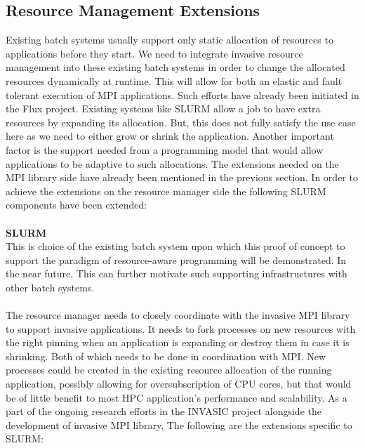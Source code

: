 \subsection{Resource Management Extensions}
Existing batch systems usually support only static allocation of resources to applications before they start. We need to integrate invasive resource management into these existing batch systems in order to change the allocated resources dynamically at runtime. This will allow for both an elastic and fault tolerant execution of MPI applications. Such efforts have already been initiated in the Flux project. Existing systems like SLURM allow a job to have extra resources by expanding its allocation. But, this does not fully satisfy the use case here as we need to either grow or shrink the application. Another important factor is the support needed from a programming model that would allow applications to be adaptive to such allocations. The extensions needed on the MPI library side have already been mentioned in the previous section. In order to achieve the extensions on the resource manager side the following SLURM components have been extended:\\ \\
\textbf{SLURM}\\
This is choice of the existing batch system upon which this proof of concept to support the paradigm of resource-aware programming will be demonstrated. In the near future, This can further motivate such supporting infrastructures with other batch systems.\\ \\
The resource manager needs to closely coordinate with the invasive MPI library to support invasive applications. It needs to fork processes on new resources with the right pinning when an application is expanding or destroy them in case it is shrinking. Both of which needs to be done in coordination with MPI. New processes could be created in the existing resource allocation of the running application, possibly allowing for oversubscription of CPU cores, but that would be of little benefit to most HPC application's performance and scalability. As a part of the ongoing research efforts in the INVASIC project alongside the development of invasive MPI library, The following are the extensions specific to SLURM:\\ \\
